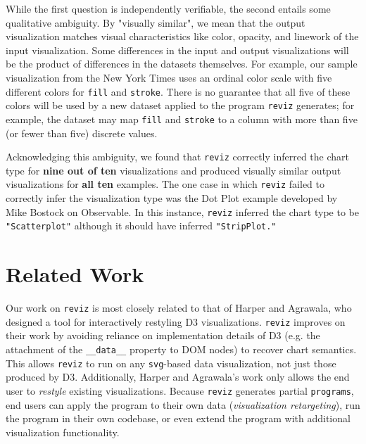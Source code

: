 \documentclass[acmsmall,screen,nonacm]{acmart}
\newcommand{\code}[1]{\texttt{#1}}
\begin{document}
While the first question is independently verifiable, the second entails some qualitative ambiguity. By "visually similar", we mean that the output visualization matches visual characteristics like color, opacity, and linework of the input visualization. Some differences in the input and output visualizations will be the product of differences in the datasets themselves. For example, our sample visualization from the New York Times uses an ordinal color scale with five different colors for \code{fill} and \code{stroke}. There is no guarantee that all five of these colors will be used by a new dataset applied to the program \code{reviz} generates; for example, the dataset may map \code{fill} and \code{stroke} to a column with more than five (or fewer than five) discrete values.

Acknowledging this ambiguity, we found that \code{reviz} correctly inferred the chart type for \textbf{nine out of ten} visualizations and produced visually similar output visualizations for \textbf{all ten} examples. The one case in which \code{reviz} failed to correctly infer the visualization type was the Dot Plot example \cite{bostock_dotplot:2018} developed by Mike Bostock on Observable. In this instance, \code{reviz} inferred the chart type to be \code{"Scatterplot"} although it should have inferred \code{"StripPlot."}

\section{Related Work}

Our work on \code{reviz} is most closely related to that of Harper and Agrawala\cite{harper_agrawala:2014}, who designed a tool for interactively restyling D3 visualizations. \code{reviz} improves on their work by avoiding reliance on implementation details of D3 (e.g. the attachment of the \code{\_\_data\_\_} property to DOM nodes) to recover chart semantics. This allows \code{reviz} to run on any \code{svg}-based data visualization, not just those produced by D3. Additionally, Harper and Agrawala's work only allows the end user to \emph{restyle} existing visualizations. Because \code{reviz} generates partial \code{programs}, end users can apply the program to their own data (\emph{visualization retargeting}), run the program in their own codebase, or even extend the program with additional visualization functionality.
\end{document}
